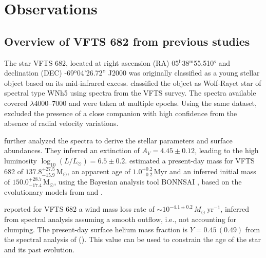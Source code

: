 \documentclass[apjl,twocolumn]{emulateapj}
\newcommand{\Msun}{{\,\mathrm{M}_\odot}}
\DeclareRobustCommand{\Tabref}[1]{Table~\ref{#1}}
\begin{document}
\section{Observations}
\label{sec:sample}

\subsection{ Overview of VFTS 682 from previous studies \label{data:vfts683}}

The star VFTS 682, located at right ascension (RA)
05$^\mathrm{h}$38$^\mathrm{m}$55.510$^\mathrm{s}$  and declination
(DEC) \mbox{-69$^\mathrm{o}$04'26.72''} J2000 \citep[][see also
\Tabref{tab:vfts682} for the coordinates from \emph{Gaia} DR2]{evans:11}
was originally classified as a young stellar object \citep{gruendl:09}
based on its mid-infrared excess. \citet{evans:11} classified the
object as Wolf-Rayet star of spectral type WNh5 using spectra from the
VFTS survey. The spectra available covered $\lambda$4000--7000 and
were taken at multiple epochs. Using the same dataset,
\citet{bestenlehner:11} excluded the presence of a close companion
with high confidence from the absence of radial velocity variations.

\citet{bestenlehner:11} further analyzed the spectra %
to derive the stellar
parameters and surface abundances. They inferred an extinction
of $A_V=4.45\pm0.12$, leading to the high luminosity
$\log_{10}(L/L_\odot) =  6.5\pm0.2$. \citet{schneider:18} estimated
a present-day mass for VFTS 682 of $137.8^{+27.5}_ {-15.9}\Msun$, an
apparent age of $1.0^{+0.2}_{-0.2}$\,Myr and an inferred initial mass
of $150.0^{+28.7}_{-17.4}\Msun$, using the Bayesian analysis tool BONNSAI
\citep{schneider:17}, based on the evolutionary models from
\citet{brott:11} and \cite{kohler:15}. %

\citet{bestenlehner:11} reported for VFTS 682 a wind mass loss rate of
$\sim10^{-4.1\pm0.2}\,M_\odot \ \mathrm{yr}^{-1}$, inferred from
spectral analysis assuming a smooth outflow, i.e., not accounting for
clumping. The present-day surface helium mass
fraction is $Y=0.45\, (0.49)$ from the spectral analysis of
\cite{bestenlehner:11} (\citealt{rubio-diez:17}). This value can be
used to constrain the age of the star and its past evolution.

\end{document}
